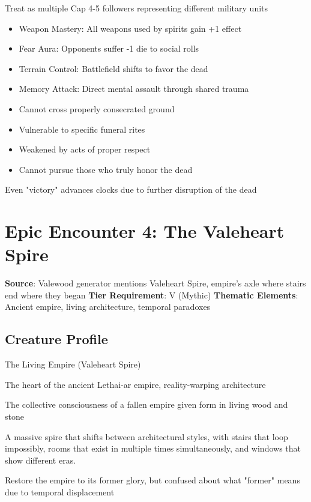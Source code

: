 \documentclass[11pt]{article}
\begin{document}
\begin{description}[leftmargin=*]
\item[Scale] Treat as multiple Cap 4-5 followers representing different military units
\item[Special Abilities]
\begin{itemize}
\item Weapon Mastery: All weapons used by spirits gain +1 effect
\item Fear Aura: Opponents suffer -1 die to social rolls
\item Terrain Control: Battlefield shifts to favor the dead
\item Memory Attack: Direct mental assault through shared trauma
\end{itemize}
\item[Weaknesses]
\begin{itemize}
\item Cannot cross properly consecrated ground
\item Vulnerable to specific funeral rites
\item Weakened by acts of proper respect
\item Cannot pursue those who truly honor the dead
\end{itemize}
\item[Consequences] Even "victory" advances clocks due to further disruption of the dead
\end{description}

\section*{Epic Encounter 4: The Valeheart Spire}

\begin{mdframed}[backgroundcolor=epicbg]
\textbf{Source}: Valewood generator mentions Valeheart Spire, empire's axle where stairs end where they began
\textbf{Tier Requirement}: V (Mythic)
\textbf{Thematic Elements}: Ancient empire, living architecture, temporal paradoxes
\end{mdframed}

\subsection*{Creature Profile}

\begin{description}[leftmargin=*]
\item[Name] The Living Empire (Valeheart Spire)
\item[Domain] The heart of the ancient Lethai-ar empire, reality-warping architecture
\item[Nature] The collective consciousness of a fallen empire given form in living wood and stone
\item[Appearance] A massive spire that shifts between architectural styles, with stairs that loop impossibly, rooms that exist in multiple times simultaneously, and windows that show different eras.
\item[Motivation] Restore the empire to its former glory, but confused about what "former" means due to temporal displacement
\end{description}
\end{document}
